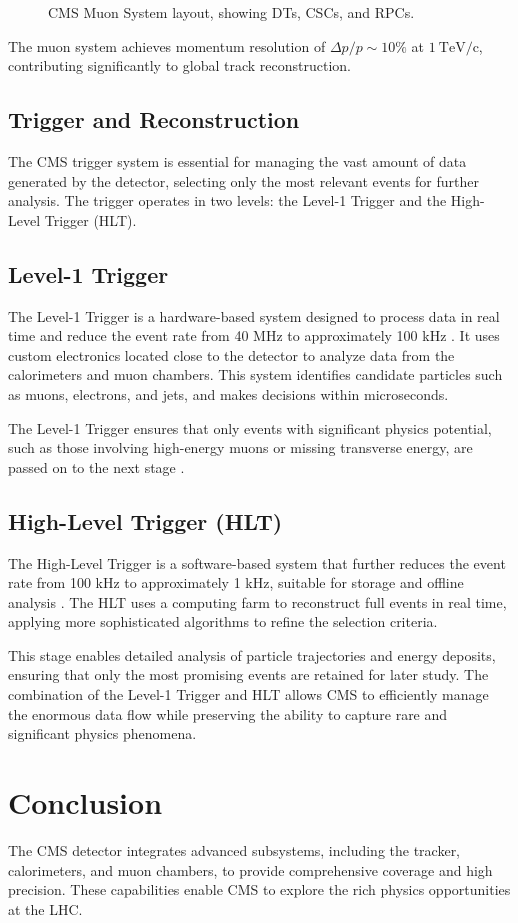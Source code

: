 \begin{figure}[ht]
    \centering
    \caption{CMS Muon System layout, showing DTs, CSCs, and RPCs.}
    \label{fig:muon_detector}
\end{figure}

The muon system achieves momentum resolution of $\Delta p / p \sim 10\%$ at $1~\mathrm{TeV/c}$, contributing significantly to global track reconstruction.\cite{cms_tdr_muon}

\subsection{Trigger and Reconstruction}
The CMS trigger system is essential for managing the vast amount of data generated by the detector, selecting only the most relevant events for further analysis. The trigger operates in two levels: the Level-1 Trigger and the High-Level Trigger (HLT).

\subsection{Level-1 Trigger}
The Level-1 Trigger is a hardware-based system designed to process data in real time and reduce the event rate from 40 MHz to approximately 100 kHz \cite{trigger_tdr}. It uses custom electronics located close to the detector to analyze data from the calorimeters and muon chambers. This system identifies candidate particles such as muons, electrons, and jets, and makes decisions within microseconds.

The Level-1 Trigger ensures that only events with significant physics potential, such as those involving high-energy muons or missing transverse energy, are passed on to the next stage \cite{trigger_tdr}.

\subsection{High-Level Trigger (HLT)}
The High-Level Trigger is a software-based system that further reduces the event rate from 100 kHz to approximately 1 kHz, suitable for storage and offline analysis \cite{trigger_tdr}. The HLT uses a computing farm to reconstruct full events in real time, applying more sophisticated algorithms to refine the selection criteria.

This stage enables detailed analysis of particle trajectories and energy deposits, ensuring that only the most promising events are retained for later study. The combination of the Level-1 Trigger and HLT allows CMS to efficiently manage the enormous data flow while preserving the ability to capture rare and significant physics phenomena.


\section{Conclusion}
The CMS detector integrates advanced subsystems, including the tracker, calorimeters, and muon chambers, to provide comprehensive coverage and high precision. These capabilities enable CMS to explore the rich physics opportunities at the LHC.
